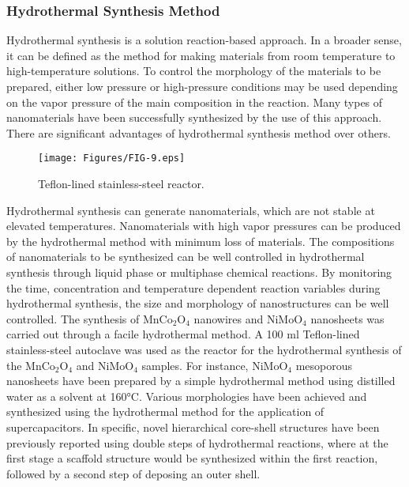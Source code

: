 \documentclass[reprint,amsmath,amssymb,aps,floatfix,
]{revtex4-2}
\begin{document}
\subsubsection{Hydrothermal Synthesis Method}
Hydrothermal synthesis is a solution reaction-based approach. In a broader sense, it can be defined as the method for making materials from room temperature to high-temperature solutions. To control the morphology of the materials to be prepared, either low pressure or high-pressure conditions may be used depending on the vapor pressure of the main composition in the reaction. Many types of nanomaterials have been successfully synthesized by the use of this approach. There are significant advantages of hydrothermal synthesis method over others.
\begin{figure}[b]
    \centering
    \texttt{[image: Figures/FIG-9.eps]}
    \caption{\label{fig:fig9}Teflon-lined stainless-steel reactor.}
    \end{figure}
Hydrothermal synthesis can generate nanomaterials, which are not stable at elevated temperatures. Nanomaterials with high vapor pressures can be produced by the hydrothermal method with minimum loss of materials. The compositions of nanomaterials to be synthesized can be well controlled in hydrothermal synthesis through liquid phase or multiphase chemical reactions. By monitoring the time, concentration and temperature dependent reaction variables during hydrothermal synthesis, the size and morphology of nanostructures can be well controlled. The synthesis of MnCo$_2$O$_4$ nanowires and NiMoO$_4$ nanosheets was carried out through a facile hydrothermal method. A 100 ml Teflon-lined stainless-steel autoclave was used as the reactor for the hydrothermal synthesis of the MnCo$_2$O$_4$ and NiMoO$_4$ samples. For instance, NiMoO$_4$ mesoporous nanosheets have been prepared by a simple hydrothermal method using distilled water as a solvent at \ang{160}C.\cite{Cai2014} Various morphologies have been achieved and synthesized using the hydrothermal method for the application of supercapacitors. In specific, novel hierarchical core-shell structures have been previously reported using double steps of hydrothermal reactions, where at the first stage a scaffold structure would be synthesized within the first reaction, followed by a second step of deposing an outer shell.\cite{Hussain2019}
\end{document}
